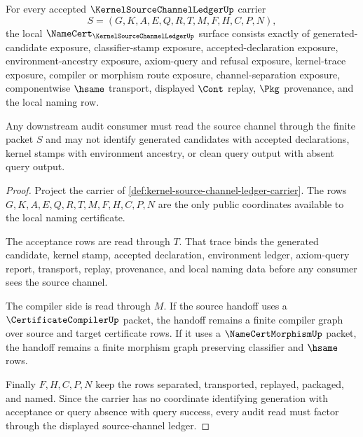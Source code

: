 \begin{theorem}
\label{thm:kernel-source-channel-ledger-namecert-obligations}
For every accepted $\KernelSourceChannelLedgerUp$ carrier
$$
S=(G,K,A,E,Q,R,T,M,F,H,C,P,N),
$$
the local $\NameCert_{\KernelSourceChannelLedgerUp}$ surface consists exactly of generated-candidate exposure, classifier-stamp exposure, accepted-declaration exposure, environment-ancestry exposure, axiom-query and refusal exposure, kernel-trace exposure, compiler or morphism route exposure, channel-separation exposure, componentwise $\hsame$ transport, displayed $\Cont$ replay, $\Pkg$ provenance, and the local naming row.

Any downstream audit consumer must read the source channel through the finite packet $S$ and may not identify generated candidates with accepted declarations, kernel stamps with environment ancestry, or clean query output with absent query output.
\end{theorem}
\begin{proof}
Project the carrier of \autoref{def:kernel-source-channel-ledger-carrier}. The rows $G,K,A,E,Q,R,T,M,F,H,C,P,N$ are the only public coordinates available to the local naming certificate.

The acceptance rows are read through $T$. That trace binds the generated candidate, kernel stamp, accepted declaration, environment ledger, axiom-query report, transport, replay, provenance, and local naming data before any consumer sees the source channel.

The compiler side is read through $M$. If the source handoff uses a $\CertificateCompilerUp$ packet, the handoff remains a finite compiler graph over source and target certificate rows. If it uses a $\NameCertMorphismUp$ packet, the handoff remains a finite morphism graph preserving classifier and $\hsame$ rows.

Finally $F,H,C,P,N$ keep the rows separated, transported, replayed, packaged, and named. Since the carrier has no coordinate identifying generation with acceptance or query absence with query success, every audit read must factor through the displayed source-channel ledger.
\end{proof}

